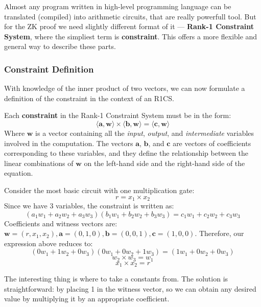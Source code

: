 \documentclass[../lecture-notes.tex]{subfiles}
\begin{document}
Almost any program written in high-level programming language can be translated (compiled) into
arithmetic circuits, that are really powerfull tool. But for the ZK proof we need slightly different
format of it --- \textbf{Rank-1 Constraint System}, where the simpliest term is \textbf{constraint}. 
This offers a more flexible and general way to describe these parts.

\subsubsection{Constraint Definition}
With knowledge of the inner product of two vectors, we can now formulate a definition of the 
constraint in the context of an R1CS.

\begin{definition}
    Each \textbf{constraint} in the Rank-1 Constraint System must be in the form:
    \begin{equation*}
        \langle \mathbf{a}, \mathbf{w}\rangle \times \langle \mathbf{b}, \mathbf{w}\rangle = \langle \mathbf{c}, \mathbf{w}\rangle
    \end{equation*}
    Where $\mathbf{w}$ is a vector containing all the \textit{input}, \textit{output}, and 
    \textit{intermediate} variables involved in the computation. The vectors $\mathbf{a}$, 
    $\mathbf{b}$, and $\mathbf{c}$ are vectors of coefficients corresponding to these variables, 
    and they define the relationship between the linear combinations of $\mathbf{w}$ on the 
    left-hand side and the right-hand side of the equation.
\end{definition}

\begin{example}
    Consider the most basic circuit with one multiplication gate:
    \begin{equation*}
        r = x_1 \times x_2
    \end{equation*}
    Since we have $3$ variables, the constraint is written as:
    \[(a_1w_1 + a_2w_2 + a_3w_3)(b_1w_1 + b_2w_2 + b_3w_3) = c_1w_1 + c_2w_2 + c_3w_3\]
    Coefficients and witness vectors are:
    $\mathbf{w} = (r, x_1, x_2), \mathbf{a} = (0, 1, 0), \mathbf{b} = (0, 0, 1), \mathbf{c} = (1, 0, 0)$. Therefore, our expression above reduces to:
    \[ (0w_1 + 1w_2 + 0w_3)(0w_1 + 0w_2 + 1w_3) = (1w_1 + 0w_2 + 0w_3) \]
    \[ w_2 \times w_3 = w_1 \]
    \[ x_1 \times x_2 = r \]
\end{example}

The interesting thing is where to take a constants from. The solution is straightforward: by placing
1 in the witness vector, so we can obtain any desired value by multiplying it by an appropriate 
coefficient.
\end{document}
